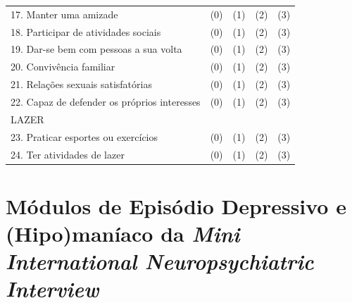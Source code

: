 \documentclass[chapter=TITLE,
               oneside,
               12pt,
               a4paper,
               english,
               brazil]{abntex2}    %
\begin{document}
\begin{anexosenv}
\begin{table}[H]
{\begin{tabular}{@{}p{}llll@{}}
            \midrule
            17. Manter uma amizade & (0) & (1) & (2) & (3) \\
            18. Participar de atividades sociais & (0) & (1) & (2) & (3) \\
            19. Dar-se bem com pessoas a sua volta & (0) & (1) & (2) & (3) \\
            20. Convivência familiar & (0) & (1) & (2) & (3) \\
            21. Relações sexuais satisfatórias & (0) & (1) & (2) & (3) \\
            22. Capaz de defender os próprios interesses & (0) & (1) & (2) & (3) \\
            \midrule
            LAZER & & & & \\
            \midrule
            23. Praticar esportes ou exercícios & (0) & (1) & (2) & (3) \\
            24. Ter atividades de lazer & (0) & (1) & (2) & (3) \\
            \bottomrule
            \end{tabular}%
            }
            \end{table}


    \chapter{Módulos de Episódio Depressivo e (Hipo)maníaco da \textit{Mini
             International Neuropsychiatric Interview}}\label{ane:mini}
        

\end{anexosenv}
\end{document}
